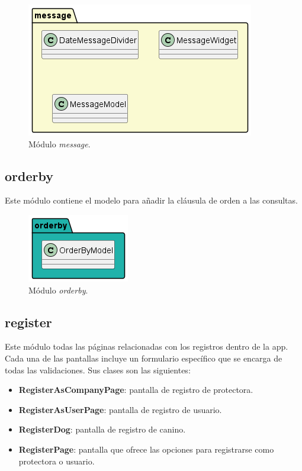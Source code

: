 \documentclass[a4paper, 12pt]{article}
\begin{document}
\begin{figure}[H]
	\begin{center}
		{\includegraphics[width=0.8\linewidth]{diagram/Message.png}\par}
		\caption{Módulo \textit{message}.}
	\end{center}
\end{figure}


\subsection*{orderby}

Este módulo contiene el modelo para añadir la cláusula de orden a las consultas.

\begin{figure}[H]
	\begin{center}
		{\includegraphics[]{diagram/OrderBy.png}\par}
		\caption{Módulo  \textit{orderby}.}
	\end{center}
\end{figure}


\subsection*{register}

Este módulo todas las páginas relacionadas con los registros dentro de la app. Cada una de las pantallas incluye un formulario específico que se encarga de todas las validaciones. Sus clases son las siguientes:

\begin{itemize}[noitemsep]
	\item \textbf{RegisterAsCompanyPage}: pantalla de registro de protectora.
	\item \textbf{RegisterAsUserPage}: pantalla de registro de usuario.
	\item \textbf{RegisterDog}: pantalla de registro de canino.
	\item \textbf{RegisterPage}:  pantalla que ofrece las opciones para registrarse como protectora o usuario.
\end{itemize}
\end{document}
